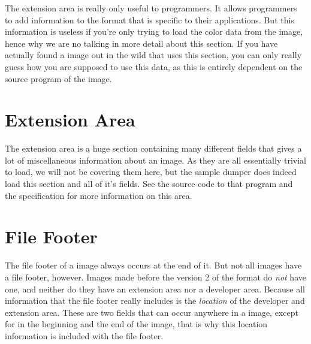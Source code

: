 \begin{refsection}
  The extension area is really only useful to programmers. It allows
  programmers to add information to the \tga format that is specific
  to their applications. But this information is useless if you're
  only trying to load the color data from the \tga image, hence why we
  are no talking in more detail about this section. If you have
  actually found a \tga image out in the wild that uses this
  section, you can only really guess how you are supposed to use this
  data, as this is entirely dependent on the source program of the image.

  \section{Extension Area}

  The extension area is a huge section containing many different
  fields that gives a lot of miscellaneous information about an
  image. As they are all essentially trivial to load, we will not be
  covering them here, but the sample \tga dumper does indeed load this
  section and all of it's fields. See the source code to that program and
  the \tga specification for more information on this area.

  \section{File Footer}

  The file footer of a \tga image always occurs at the end of it. But
  not all \tga images have a file footer, however. Images made before
  the version 2 of the \tga format do \textit{not} have one, and
  neither do they have an extension area nor a developer area. Because
  all information that the file footer really includes is the
  \textit{location} of the developer and extension area. These are two
  fields that can occur anywhere in a \tga image, except for in the
  beginning and the end of the image, that is why this location
  information is included with the file footer.

  \printbibliography[heading=subbibliography]

\end{refsection}